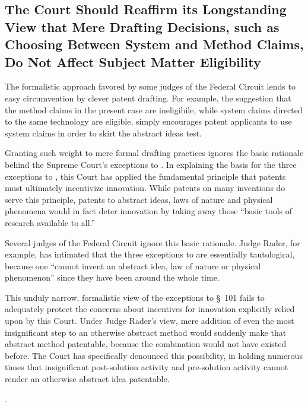 \documentclass{scotus}
\begin{document}
%
%
\subsection{The Court Should Reaffirm its Longstanding View that Mere Drafting
Decisions, such as Choosing Between System and Method Claims, Do Not Affect
Subject Matter Eligibility}

The formalistic approach favored by some judges of the Federal Circuit lends to
easy circumvention by clever patent drafting. For example, the suggestion that
the method claims in the present case are ineligibile, while system claims
directed to the same technology are eligible, simply encourages patent
applicants to use system claims in order to skirt the abstract ideas test.

Granting such weight to mere formal drafting practices ignores the basic
rationale behind the Supreme Court's exceptions to . In explaining
the basis for the three exceptions to , this Court has applied the
fundamental principle that patents must ultimately incentivize innovation. While
patents on many inventions do serve this principle, patents to abstract ideas,
laws of nature and physical phenomena would in fact deter innovation by taking
away those ``basic tools of research available to all.''

Several judges of the Federal Circuit ignore this basic rationale. Judge Rader,
for example, has intimated that the three exceptions to  are
essentially tautological, because one ``cannot invent an abstract idea, law of
nature or physical phenomenon'' since they have been around the whole time.

This unduly narrow, formalistic view of the exceptions to \S~101 fails to
adequately protect the concerns about incentives for innovation explicitly
relied upon by this Court. Under Judge Rader's view, mere addition of even the
most insignificant step to an otherwise abstract method would suddenly make that
abstract method patentable, because the combination would not have existed
before. The Court has specifically denounced this possibility, in holding
numerous times that insignificant post-solution activity and pre-solution
activity cannot render an otherwise abstract idea patentable.

.
\end{document}
